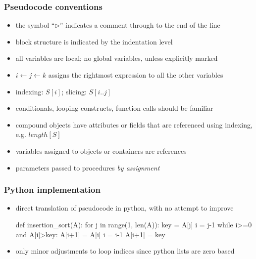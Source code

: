 \begin{frame}[fragile]
%
  \frametitle{Pseudocode conventions}
%
  \begin{itemize}
  \item the symbol ``$\triangleright$'' indicates a comment through to the end of the line
  \item block structure is indicated by the indentation level
  \item all variables are local; no global variables, unless explicitly marked
  \item $i \leftarrow j \leftarrow k$ assigns the rightmost expression to all the other
    variables
  \item indexing: $S[i]$; slicing: $S[i .. j]$
  \item conditionals, looping constructs, function calls should be familiar
  \item compound objects have attributes or fields that are referenced using indexing,
    e.g. $length[S]$
  \item variables assigned to objects or containers are references
  \item parameters passed to procedures {\em by assignment}
  \end{itemize}
%
\end{frame}
        
\begin{frame}[fragile]
%
  \frametitle{Python implementation}
%
  \begin{itemize}
%
  \item direct translation of pseudocode in python, with no attempt to improve
%
  \begin{center}
    \begin{minipage}[h]{.75\linewidth}
      \begin{python}[%
        label={lst:insertion-sort:python},
        caption={Python implementation of insertion\_sort}
]
%
def insertion_sort(A):
    for j in range(1, len(A)):
        key = A[j]
        i = j-1
        while i>=0 and A[i]>key:
            A[i+1] = A[i]
            i = i-1
        A[i+1] = key
      \end{python}
    \end{minipage}
  \end{center}
%
  \item only minor adjustments to loop indices since python lists are zero based
  \end{itemize}
%
\end{frame}

